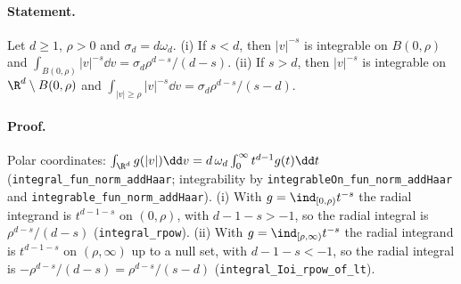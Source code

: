 \paragraph{Statement.} Let $d\geq1$, $\rho>0$ and $\sigma_d=d\omega_d$. (i) If $s<d$, then
$|v|^{-s}$ is integrable on $B(0,\rho)$ and $\int_{B(0,\rho)}|v|^{-s}\dd v=\sigma_d\rho^{d-s}/(d-s)$.
(ii) If $s>d$, then $|v|^{-s}$ is integrable on $\R^d\setminus B(0,\rho)$ and
$\int_{|v|\geq\rho}|v|^{-s}\dd v=\sigma_d\rho^{d-s}/(s-d)$.
\paragraph{Proof.} Polar coordinates: $\int_{\R^d}g(|v|)\dd v=d\,\omega_d\int_0^\infty t^{d-1}g(t)\dd t$
(\texttt{integral\_fun\_norm\_addHaar}; integrability by \texttt{integrableOn\_fun\_norm\_addHaar} and
\texttt{integrable\_fun\_norm\_addHaar}). (i) With $g=\ind_{[0,\rho)}t^{-s}$ the radial integrand is
$t^{d-1-s}$ on $(0,\rho)$, with $d-1-s>-1$, so the radial integral is $\rho^{d-s}/(d-s)$
(\texttt{integral\_rpow}). (ii) With $g=\ind_{[\rho,\infty)}t^{-s}$ the radial integrand is
$t^{d-1-s}$ on $(\rho,\infty)$ up to a null set, with $d-1-s<-1$, so the radial integral is
$-\rho^{d-s}/(d-s)=\rho^{d-s}/(s-d)$ (\texttt{integral\_Ioi\_rpow\_of\_lt}).
